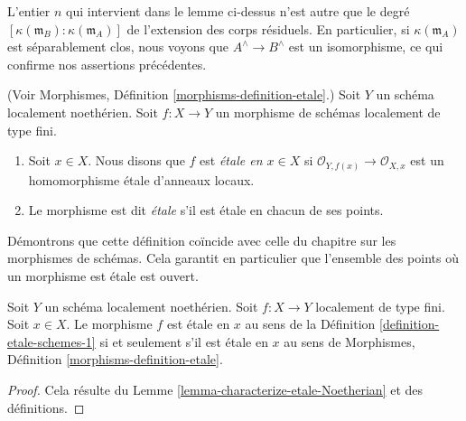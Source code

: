 \noindent
L'entier $n$ qui intervient dans le lemme ci-dessus
n'est autre que le degré
$[\kappa(\mathfrak m_B) : \kappa(\mathfrak m_A)]$ de l'extension des corps
résiduels. En particulier, si $\kappa(\mathfrak m_A)$
est séparablement clos, nous voyons que $A^\wedge \to B^\wedge$
est un isomorphisme, ce qui confirme nos assertions précédentes.

\begin{definition}
\label{definition-etale-schemes-1}
(Voir Morphismes, Définition \ref{morphisms-definition-etale}.)
Soit $Y$ un schéma localement noethérien.
Soit $f : X \to Y$ un morphisme de schémas localement de type fini.
\begin{enumerate}
\item Soit $x \in X$. Nous disons que $f$ est {\it \'etale en $x \in X$} si
$\mathcal{O}_{Y, f(x)} \to \mathcal{O}_{X, x}$ est un
homomorphisme \'etale d'anneaux locaux.
\item Le morphisme est dit {\it \'etale} s'il est \'etale en chacun de ses
points.
\end{enumerate}
\end{definition}

\noindent
Démontrons que cette définition coïncide avec celle du
chapitre sur les morphismes de schémas. Cela garantit en particulier que
l'ensemble des points où un morphisme est \'etale est ouvert.

\begin{lemma}
\label{lemma-etale-definition}
Soit $Y$ un schéma localement noethérien.
Soit $f : X \to Y$ localement de type fini.
Soit $x \in X$. Le morphisme $f$ est \'etale en $x$ au
sens de la Définition \ref{definition-etale-schemes-1}
si et seulement s'il est \'etale en $x$ au
sens de Morphismes, Définition \ref{morphisms-definition-etale}.
\end{lemma}

\begin{proof}
Cela résulte du Lemme \ref{lemma-characterize-etale-Noetherian}
et des définitions.
\end{proof}

